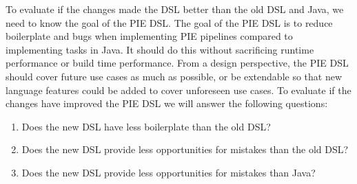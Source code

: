 To evaluate if the changes made the \ac{DSL} better than the old \ac{DSL} and Java, we need to know the goal of the \ac{PIE} \ac{DSL}.
The goal of the \ac{PIE} \ac{DSL} is to reduce boilerplate and bugs when implementing \ac{PIE} pipelines compared to implementing tasks in Java.
It should do this without sacrificing runtime performance or build time performance.
From a design perspective, the \ac{PIE} \ac{DSL} should cover future use cases as much as possible, or be extendable so that new language features could be added to cover unforeseen use cases.
To evaluate if the changes have improved the \ac{PIE} \ac{DSL} we will answer the following questions:
\begin{enumerate}
  \item Does the new \ac{DSL} have less boilerplate than the old \ac{DSL}?
  \item Does the new \ac{DSL} provide less opportunities for mistakes than the old \ac{DSL}?
  \item Does the new \ac{DSL} provide less opportunities for mistakes than Java?

\end{enumerate}
